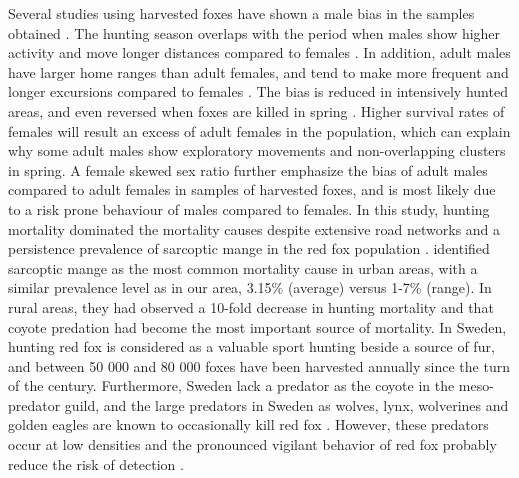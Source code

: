 Several studies using harvested foxes have shown a male bias in the samples obtained \citep{harrisDemographyTwoUrban1987,gortazarHabitatRelatedDifferences2003,goszczynskiPopulationDynamicsRed1989,yonedaEffectsHuntingAge1982,englund1970some,hartova-nentvichovaCranialOntogeneticVariability2010}. The hunting season overlaps with the period when males show higher activity and move longer distances compared to females \citep{englundPopulationDynamicsRed1980}. In addition, adult males have larger home ranges than adult females, and tend to make more frequent and longer excursions compared to females \citep{soulsburyBehavioralSpatialAnalysis2011}.  The bias is reduced in intensively hunted areas, and even reversed when foxes are killed in spring \citep{yonedaEffectsHuntingAge1982,goszczynskiPopulationDynamicsRed1989, galbyMoreFemaleRed2010}. Higher survival rates of females will result an excess of adult females in the population, which can explain why some adult males show exploratory movements and non-overlapping clusters in spring. A female skewed sex ratio further emphasize the bias of adult males compared to adult females in samples of harvested foxes, and is most likely due to a risk prone behaviour of males compared to females.   
In this study, hunting mortality dominated the mortality causes despite extensive road networks and a persistence prevalence of sarcoptic mange in the red fox population \citep{carricondo-sanchezRangeMangeSpatiotemporal2017}.\citet{gosselinkSurvivalCauseSpecificMortality2007} identified sarcoptic mange as the most common mortality cause in urban areas, with a similar prevalence level as in our area, 3.15\% (average) versus 1-7\% (range). In rural areas, they had observed a 10-fold decrease in hunting mortality and that coyote predation had become the most important source of mortality. In Sweden, hunting red fox is considered as a valuable sport hunting beside a source of fur, and between 50 000 and 80 000 foxes have been harvested annually since the turn of the century. Furthermore, Sweden lack a predator as the coyote in the meso-predator guild, and the large predators in Sweden as wolves, lynx, wolverines and golden eagles are known to occasionally kill red fox \citep{helldinLynxLynxLynx2006,sulkavaChangesDietGolden1999,vandijkForagingStrategiesWolverines2008}. However, these predators occur at low densities and  the pronounced vigilant behavior of red fox probably reduce the risk of detection \citep{berger-talLookYouLeap2009}. 







